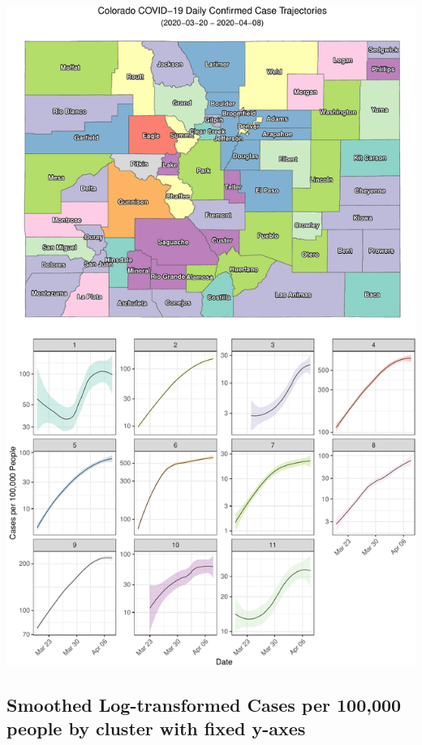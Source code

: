 \documentclass[]{article}
\begin{document}
\includegraphics{figs/county-clusters-smooth-raw-1.pdf}

\hypertarget{smoothed-log-transformed-cases-per-100000-people-by-cluster-with-fixed-y-axes}{%
\subsection{Smoothed Log-transformed Cases per 100,000 people by cluster
with fixed
y-axes}\label{smoothed-log-transformed-cases-per-100000-people-by-cluster-with-fixed-y-axes}}
\end{document}
